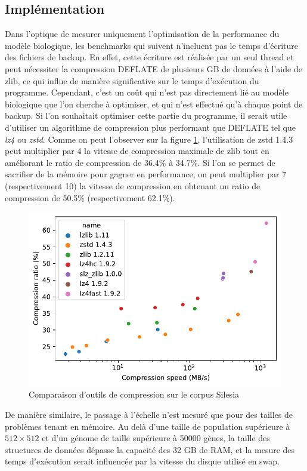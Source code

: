 \documentclass[a4paper, 10pt, twoside]{article}
\begin{document}
\subsection{Implémentation}

Dans l'optique de mesurer uniquement l'optimisation de la performance du modèle biologique, les benchmarks qui suivent n'incluent pas le temps d'écriture des fichiers de backup. En effet, cette écriture est réalisée par un seul thread et peut nécessiter la compression DEFLATE de plusieurs GB de données à l'aide de zlib, ce qui influe de manière significative sur le temps d'exécution du programme. Cependant, c'est un coût qui n'est pas directement lié au modèle biologique que l'on cherche à optimiser, et qui n'est effectué qu'à chaque point de backup. Si l'on souhaitait optimiser cette partie du programme, il serait utile d'utiliser un algorithme de compression plus performant que DEFLATE tel que \textit{lz4} ou \textit{zstd}. Comme on peut l'observer sur la figure \ref{fig:compression/tools}, l'utilisation de zstd 1.4.3 peut multiplier par 4 la vitesse de compression maximale de zlib tout en améliorant le ratio de compression de 36.4\% à 34.7\%. Si l'on se permet de sacrifier de la mémoire pour gagner en performance, on peut multiplier par 7 (respectivement 10) la vitesse de compression en obtenant un ratio de compression de 50.5\% (respectivement 62.1\%).

\begin{figure}[htb]
	\centering
	\includegraphics[width=0.5\linewidth]{img/compression_tools.pdf}
	\caption{Comparaison d'outils de compression sur le corpus Silesia \cite{lzbench}}
	\label{fig:compression/tools}
\end{figure}

De manière similaire, le passage à l'échelle n'est mesuré que pour des tailles de problèmes tenant en mémoire. Au delà d'une taille de population supérieure à $512 \times 512$ et d'un génome de taille supérieure à 50000 gènes, la taille des structures de données dépasse la capacité des 32 GB de RAM, et la mesure des temps d'exécution serait influencée par la vitesse du disque utilisé en swap.
\end{document}
